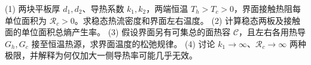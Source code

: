 (1) 两块平板厚 \(d_1,d_2\)、导热系数 \(k_1,k_2\)，两端恒温 \(T_h>T_c>0\)，界面接触热阻每单位面积为 \(\mathcal R_c>0\)。求稳态热流密度和界面左右温度。
(2) 计算稳态两板及接触面的单位面积总熵产生率。
(3) 假设界面另有可集总的面热容 \(\mathcal C\)，且左右各用热导 \(G_h,G_c\) 接至恒温热源，求界面温度的松弛规律。
(4) 讨论 \(k_1\to\infty\)、\(\mathcal R_c\to\infty\) 两种极限，并解释为何仅加大一侧导热率可能几乎无效。
